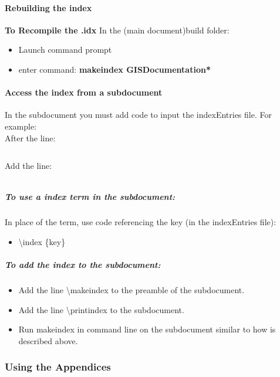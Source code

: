 \paragraph{Rebuilding the index}

\textbf{To Recompile the .idx} In the (main document)build folder:
\begin{itemize}
\item Launch command prompt
\item enter command: \textbf{{\large makeindex GISDocumentation*}}
\end{itemize}
\paragraph{Access the index from a subdocument}
In the subdocument you must add code to input the indexEntries file.  For example:\\
After the line:
\begin{verbatim}

\end{verbatim}
Add the line:
\begin{verbatim}

\end{verbatim}
\subparagraph[Using an index term]{To use a index term in the subdocument:}
In place of the term, use code referencing the key (in the indexEntries file):
\begin{itemize}
\item \textbackslash index \{key\}
\end{itemize}
\subparagraph{To add the index to the subdocument:}
\begin{itemize}
\item Add the line \textbackslash makeindex to the preamble of the subdocument.
\item Add the line \textbackslash printindex to the subdocument.
\item Run makeindex in command line on the subdocument similar to how is described above.
\end{itemize}
\subsubsection[Using the Appendices]{{Using the Appendices}}


